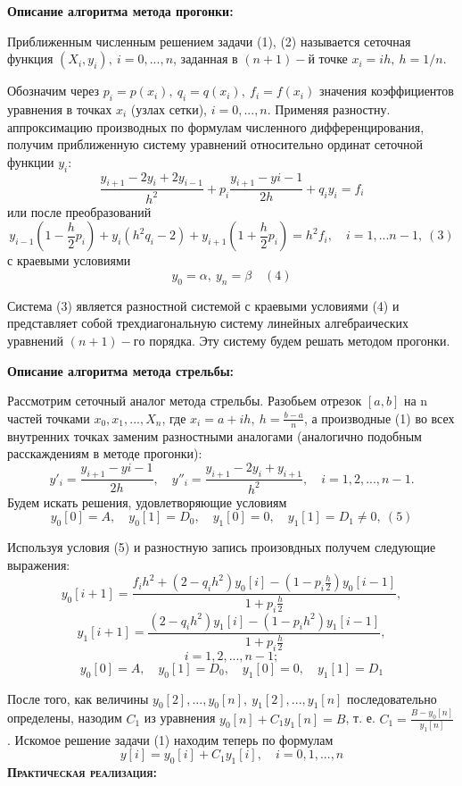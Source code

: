 \documentclass [12pt]{article}
\begin{document}
\textbf{Описание алгоритма метода прогонки:}

Приближенным численным решением задачи (1), (2) называется сеточная функция $ (X_i, y_i), \: i = 0,...,n$, заданная в $(n+1)-й$ точке $x_i = ih, \: h = 1/n$. 

Обозначим через $p_i = p(x_i), \: q_i = q(x_i), \: f_i = f(x_i)$ значения коэффициентов уравнения в точках $x_i$ (узлах сетки), $i = 0,...,n$. Применяя разностну. аппроксимацию производных по формулам численного дифференцирования, получим приближенную систему уравнений относительно ординат сеточной функции $y_i:$ $$ \frac{y_{i+1} - 2y_i + 2y_{i-1}}{h^2} + p_i\frac{y_{i+1} - y{i-1}}{2h} + q_iy_i=f_i$$ или после преобразований $$ y_{i-1}(1 - \frac{h}{2}p_i) + y_i(h^2q_i - 2) + y_{i+1}(1 + \frac{h}{2}p_i) = h^2f_i, \quad i = 1,...n-1, \: (3) $$ с краевыми условиями $$ y_0 = \alpha, \: y_n = \beta \quad (4)$$

Система (3) является разностной системой с краевыми условиями (4) и представляет собой трехдиагональную систему линейных алгебраических уравнений $(n+1)-го$ порядка. Эту систему будем решать методом прогонки.

\textbf{Описание алгоритма метода стрельбы:}

Рассмотрим сеточный аналог метода стрельбы. Разобьем отрезок $[a,b]$ на n частей точками $x_0, x_1, ... ,X_n$, где $x_i = a + ih, \: h=\frac{b-a}{n}$, а производные (1) во всех внутренних точках заменим разностными аналогами (аналогично подобным расскаждениям в методе прогонки): $$ y'_i = \frac{y_{i+1}-y{i-1}}{2h}, \quad y''_i = \frac{y_{i+1} - 2y_i + y_{i+1}}{h^2}, \quad i = 1,2,...,n-1.$$ Будем искать решения, удовлетворяющие условиям $$y_{0}[0] = A, \quad y_{0}[1] = D_{0}, \quad y_{1}[0] = 0, \quad y_{1}[1] = D_{1} \neq 0, \: (5)$$ 

Используя условия (5) и разностную запись произовдных получем следующие выражения: $$ y_{0}[i+1] = \frac{f_ih^2 + (2 - q_ih^2)y_{0}[i] - (1-p_i\frac{h}{2})y_{0}[i-1]}{1 + p_i\frac{h}{2}},$$ $$ y_{1}[i+1]=\frac{(2 - q_ih^2)y_{1}[i] - (1-p_ih^2)y_{1}[i-1]}{1 + p_i\frac{h}{2}},$$ $$ i = 1,2,...,n-1;$$ $$ y_{0}[0] = A, \quad y_{0}[1] = D_{0}, \quad y_{1}[0] = 0, \quad y_{1}[1] = D_{1}$$

После того, как величины $ y_{0}[2],...,y_{0}[n], \: y_{1}[2],...,y_{1}[n]$ последовательно определены, назодим $C_{1}$ из уравнения $y_{0}[n] + C_{1}y_{1}[n] = B$, т. е. $C_{1} = \frac{B - y_{0}[n]}{y_{1}[n]}$. Искомое решение задачи (1) находим теперь по формулам $$ y[i] = y_{0}[i] + C_{1}y_{1}[i], \quad i = 0,1,...,n$$
\textsc{\textbf{Практическая реализация:}}
\end{document}
